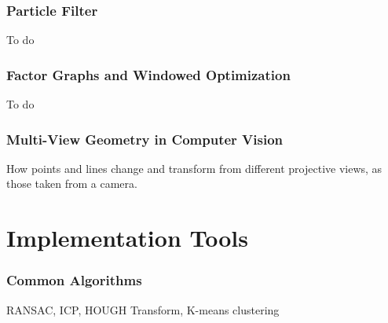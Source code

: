 \documentclass[a4paper,11pt]{article}
\begin{document}
\newpage
\section{Particle Filter}
To do

\newpage
\section{Factor Graphs and Windowed Optimization}
To do

\newpage
\section{Multi-View Geometry in Computer Vision}
How points and lines change and transform from different projective views, as those taken from a camera.

\newpage
\part{Implementation Tools}
\newpage
\section{Common Algorithms}
RANSAC, ICP, HOUGH Transform, K-means clustering

\newpage


\end{document}
